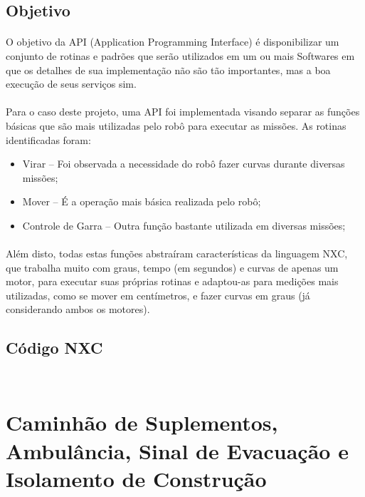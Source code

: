 \documentclass[12pt,a4paper]{article}
\begin{document}
	\subsection{Objetivo}
		\paragraph{}
			O objetivo da API (Application Programming Interface) é 
			disponibilizar um conjunto de rotinas e padrões que serão utilizados 
			em um ou mais Softwares em que os detalhes de sua implementação não 
			são tão importantes, mas a boa execução de seus serviços sim.
		\paragraph{}
			Para o caso deste projeto, uma API foi implementada visando separar 
			as funções básicas que são mais utilizadas pelo robô para executar 
			as missões. As rotinas identificadas foram:

		\begin{itemize}
			\item Virar – Foi observada a necessidade do robô fazer curvas 
			durante diversas missões;
			\item Mover – É a operação mais básica realizada pelo robô;
			\item Controle de Garra – Outra função bastante utilizada em 
			diversas missões;
		\end{itemize}

		\paragraph{}
			Além disto, todas estas funções abstraíram características da 
			linguagem NXC, que trabalha muito com graus, tempo (em segundos) e 
			curvas de apenas um motor, para executar suas próprias rotinas e 
			adaptou-as para medições mais utilizadas, como se mover em 
			centímetros, e fazer curvas em graus (já considerando ambos os 
			motores).

	\subsection{Código NXC}
		\inputminted[linenos, frame = single]{c}{../theBugAPI.c}
			\label{lst: thebugapi.c}
		
		\inputminted[linenos, frame = single]{c}{../theBugAPI.h}
			\label{lst: thebugapi.h}

\newpage
\section{Caminhão de Suplementos, Ambulância, Sinal de Evacuação e Isolamento de 
Construção}
\end{document}
